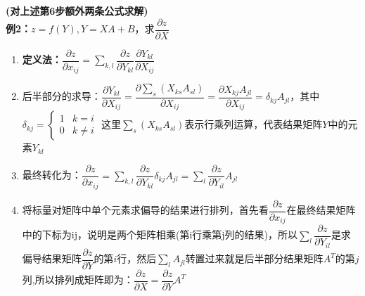 \documentclass[UTF8]{article}
\begin{document}
    \textbf{(对上述第6步额外两条公式求解)}
    \\
    \textbf{例2：}$z=f(Y), Y=XA+B$，求$\dfrac{\partial z}{\partial X}$
    \begin{enumerate}
        \item \textbf{定义法：}$\dfrac{\partial z}{\partial x_{i j}}=\sum_{k, l} \dfrac{\partial z}{\partial Y_{k l}} \dfrac{\partial Y_{k l}}{\partial X_{i j}}$
        \item 后半部分的求导：$\dfrac{\partial Y_{k l}}{\partial X_{i j}}=\dfrac{\partial \sum_{s}\left(X_{k s} A_{s l}\right)}{\partial X_{i j}}=\dfrac{\partial X_{k j} A_{j l}}{\partial X_{i j}}=\delta_{k j} A_{j l} $，其中$\delta_{kj}=\left\{\begin{array}{ll}1 & k=i \\ 0 & k \neq i\end{array}\right.$ 这里$\sum_{s}(X_{k s} A_{s l})$表示行乘列运算，代表结果矩阵$Y$中的元素$Y_{kl}$
        \item 最终转化为：$\dfrac{\partial z}{\partial x_{i j}}=\sum_{k, l} \dfrac{\partial z}{\partial Y_{k l}} \delta_{k j} A_{j l} =\sum_{l} \dfrac{\partial z}{\partial Y_{i l}} A_{j l}$
        \item 将标量对矩阵中单个元素求偏导的结果进行排列，首先看$\dfrac{\partial z}{\partial x_{ij}}$在最终结果矩阵中的下标为ij，说明是两个矩阵相乘(第i行乘第j列的结果)，所以$\sum_{l} \dfrac{\partial z}{\partial Y_{i l}}$是求偏导结果矩阵$\dfrac{\partial z}{\partial Y}$的第$i$行，然后$\sum_{l} A_{jl}$转置过来就是后半部分结果矩阵$A^T$的第$j$列,所以排列成矩阵即为：$\dfrac{\partial z}{\partial X}=\dfrac{\partial z}{\partial Y}A^{T} $
    \end{enumerate}
\end{document}
